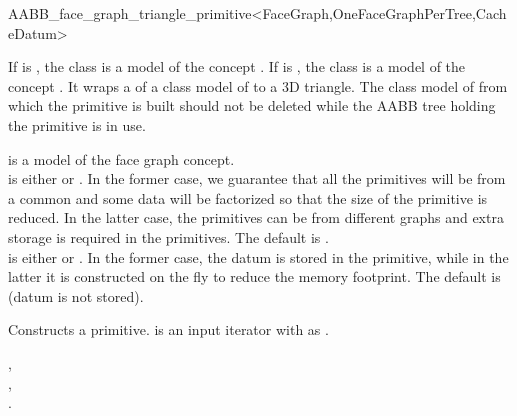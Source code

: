 \ccRefPageBegin

\begin{ccRefClass}{AABB_face_graph_triangle_primitive<FaceGraph,OneFaceGraphPerTree,CacheDatum>}

\ccDefinition
  
If  is , the class is a model of the concept .
If  is , the class  is a model of the concept .
It wraps a  of a class model of  to a 3D triangle.
The class model of  from which the primitive is built should not be deleted
while the AABB tree holding the primitive is in use.



\ccParameters
{} is a model of the face graph concept.\\
 is either  or . In the former case, we guarantee that all the primitives will be from a common  and some data 
will be factorized so that the size of the primitive is reduced. In the latter case, the primitives can be from different graphs and extra storage is required in the primitives. The default is .\\
 is either  or . In the former case, the datum is stored in the primitive, while in the latter it is constructed on the fly to reduce
the memory footprint. The default is  (datum is not stored).\\


\ccTypes
{}
\ccGlue
{}
\ccGlue
{}

\ccCreation
{}

{Constructs a primitive.  is an input iterator with  as .}


\ccSeeAlso

,\\
,\\
.\\

\end{ccRefClass}

\ccRefPageEnd
